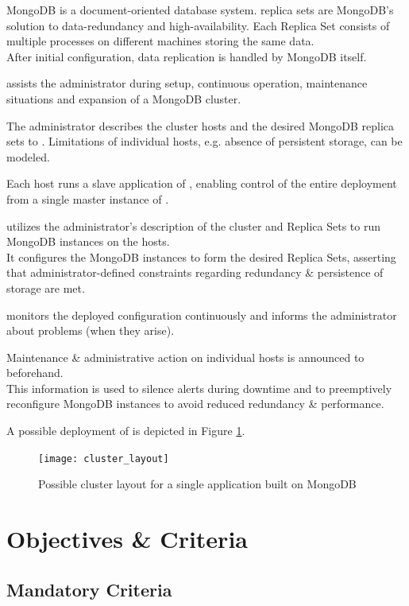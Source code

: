 \documentclass[a4paper, 11pt]{article}
\let\oldsection\section
\renewcommand\section{\clearpage\oldsection}
\begin{document}
\gls{MongoDB} is a document-oriented database system. \glspl{replica set} are MongoDB's solution to data-redundancy and high-availability. Each Replica Set consists of multiple processes on different machines storing the same data.\\
After initial configuration, data replication is handled by MongoDB itself.

\mamid assists the \gls{administrator} during setup, continuous operation, maintenance situations and expansion of a \gls{MongoDB} cluster.

The \gls{administrator} describes the cluster \glspl{host} and the desired \gls{MongoDB} \glspl{replica set} to \mamid.
Limitations of individual hosts, e.g. absence of persistent storage, can be modeled.

Each \gls{host} runs a \gls{slave} application of \mamid, enabling control of the entire deployment from a single \gls{master} instance of \mamid.

\mamid utilizes the \gls{administrator}'s description of the cluster and Replica Sets to run \gls{MongoDB} instances on the \glspl{host}.\\
It configures the \gls{MongoDB} instances to form the desired Replica Sets, asserting that administrator-defined constraints regarding redundancy \& persistence of storage are met.

\mamid monitors the deployed configuration continuously and informs the \gls{administrator} about problems (when they arise).

Maintenance \& administrative action on individual hosts is announced to \mamid beforehand.\\
This information is used to silence alerts during downtime and to preemptively reconfigure MongoDB instances to avoid reduced redundancy \& performance.

A possible deployment of \mamid is depicted in Figure \ref{fig:cluster_layout}.

\begin{figure}[H]
	\centering
	\texttt{[image: cluster\_layout]} %
	\caption{Possible cluster layout for a single application built on MongoDB}
	\label{fig:cluster_layout}
\end{figure}

\section{Objectives \& Criteria}
\subsection{Mandatory Criteria}\label{MandatoryCriteria}
\end{document}
